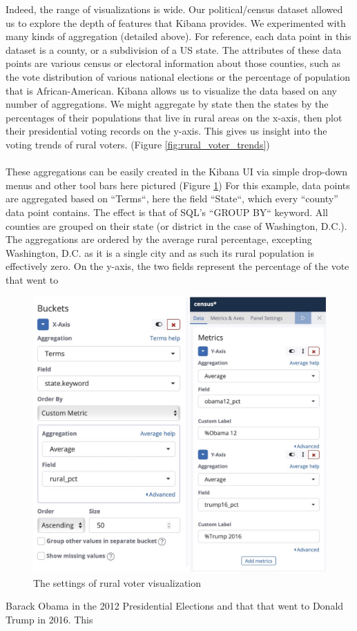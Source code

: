 \documentclass[bibliography=totoc]{article}
\begin{document}
Indeed, the range of visualizations is wide. Our political/census dataset allowed us to explore the depth
of features that Kibana provides. We experimented with many kinds of aggregation (detailed above). For
reference, each data point in this dataset is a county, or a subdivision of a US state. The attributes of
these data points are various census or electoral information about those counties, such as the vote
distribution of various national elections or the percentage of population that is African-American. Kibana
allows us to visualize the data based on any number of aggregations. We might aggregate by state then the
states by the percentages of their populations that live in rural areas on the x-axis, then plot their
presidential voting records on the y-axis. This gives us insight into the voting trends of rural voters.
(Figure \ref{fig:rural_voter_trends})
\\
\\
These aggregations can be easily created in the Kibana UI via simple drop-down menus and other tool bars
here pictured (Figure \ref{fig:rural_voters_settings}) For this example, data points are aggregated based on ``Terms``, here the field ``State``,
which every “county” data point contains. The effect is that of SQL's ``GROUP BY`` keyword. All counties are
grouped on their state (or district in the case of Washington, D.C.). The aggregations are ordered by the
average rural percentage, excepting Washington, D.C. as it is a single city and as such its rural
population is effectively zero. On the y-axis, the two fields represent the percentage of the vote that went to
\begin{figure}[!htb]
  \centering
  \includegraphics[height=0.5\textwidth]{rural_voters_settings.png}
 \caption{The settings of rural voter visualization}
  \label{fig:rural_voters_settings}
\end{figure}
Barack Obama in the 2012 Presidential Elections and that that went to Donald Trump in 2016. This
\end{document}
